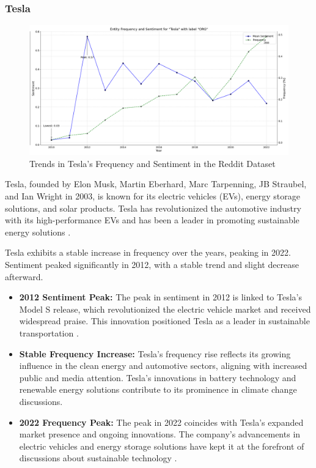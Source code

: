\subsubsection{Tesla}
\begin{figure}[h]
    \includegraphics[width=\textwidth]{images/topic_details/entities/entity_frequency_Tesla.png}
    \caption{Trends in Tesla's Frequency and Sentiment in the Reddit Dataset}
    \label{fig:entity_tesla}
\end{figure}

Tesla, founded by Elon Musk, Martin Eberhard, Marc Tarpenning, JB Straubel, and Ian Wright in 2003, is known for its electric vehicles (EVs), energy storage solutions, and solar products. Tesla has revolutionized the automotive industry with its high-performance EVs and has been a leader in promoting sustainable energy solutions \cite{britannica2024tesla}.

Tesla exhibits a stable increase in frequency over the years, peaking in 2022. Sentiment peaked significantly in 2012, with a stable trend and slight decrease afterward.

\begin{itemize}
    \item \textbf{2012 Sentiment Peak:} The peak in sentiment in 2012 is linked to Tesla's Model S release, which revolutionized the electric vehicle market and received widespread praise. This innovation positioned Tesla as a leader in sustainable transportation \cite{tesla2012,teslamag2022}.
    \item \textbf{Stable Frequency Increase:} Tesla's frequency rise reflects its growing influence in the clean energy and automotive sectors, aligning with increased public and media attention. Tesla's innovations in battery technology and renewable energy solutions contribute to its prominence in climate change discussions.
    \item \textbf{2022 Frequency Peak:} The peak in 2022 coincides with Tesla's expanded market presence and ongoing innovations. The company's advancements in electric vehicles and energy storage solutions have kept it at the forefront of discussions about sustainable technology \cite{notateslaapp2023}.
\end{itemize}

